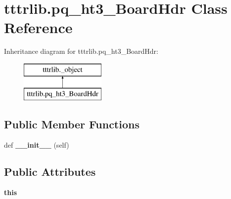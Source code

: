 \hypertarget{classtttrlib_1_1pq__ht3___board_hdr}{}\section{tttrlib.\+pq\+\_\+ht3\+\_\+\+Board\+Hdr Class Reference}
\label{classtttrlib_1_1pq__ht3___board_hdr}
Inheritance diagram for tttrlib.\+pq\+\_\+ht3\+\_\+\+Board\+Hdr\+:\begin{figure}[H]
\begin{center}
\leavevmode
\includegraphics[height=2.000000cm]{classtttrlib_1_1pq__ht3___board_hdr}
\end{center}
\end{figure}
\subsection*{Public Member Functions}
\begin{DoxyCompactItemize}
\item 
\mbox{\label{classtttrlib_1_1pq__ht3___board_hdr_ad7fb997a793cf2ff2d9c0034db8ca2c1}} 
def {\bfseries \+\_\+\+\_\+init\+\_\+\+\_\+} (self)
\end{DoxyCompactItemize}
\subsection*{Public Attributes}
\begin{DoxyCompactItemize}
\item 
\mbox{\label{classtttrlib_1_1pq__ht3___board_hdr_a898fec6b5c023d24ffe26bd684d737d5}} 
{\bfseries this}
\end{DoxyCompactItemize}
